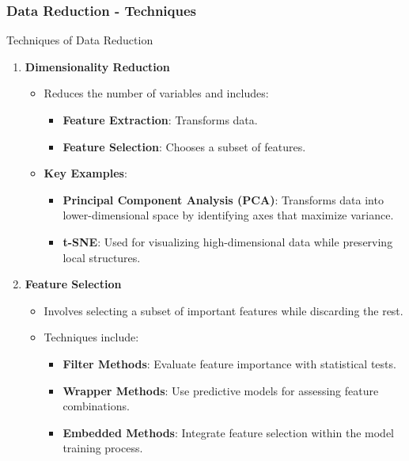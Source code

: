 \documentclass[aspectratio=169]{beamer}
\begin{document}
\begin{frame}[fragile]
    \frametitle{Data Reduction - Techniques}
    \begin{block}{Techniques of Data Reduction}
        \begin{enumerate}
            \item \textbf{Dimensionality Reduction}
            \begin{itemize}
                \item Reduces the number of variables and includes:
                \begin{itemize}
                    \item \textbf{Feature Extraction}: Transforms data.
                    \item \textbf{Feature Selection}: Chooses a subset of features.
                \end{itemize}
                \item \textbf{Key Examples}:
                \begin{itemize}
                    \item \textbf{Principal Component Analysis (PCA)}: Transforms data into lower-dimensional space by identifying axes that maximize variance.
                    \item \textbf{t-SNE}: Used for visualizing high-dimensional data while preserving local structures.
                \end{itemize}                
            \end{itemize}

            \item \textbf{Feature Selection}
            \begin{itemize}
                \item Involves selecting a subset of important features while discarding the rest.
                \item Techniques include:
                \begin{itemize}
                    \item \textbf{Filter Methods}: Evaluate feature importance with statistical tests.
                    \item \textbf{Wrapper Methods}: Use predictive models for assessing feature combinations.
                    \item \textbf{Embedded Methods}: Integrate feature selection within the model training process. 
                \end{itemize}
            \end{itemize}
        \end{enumerate}
    \end{block}
\end{frame}
\end{document}
